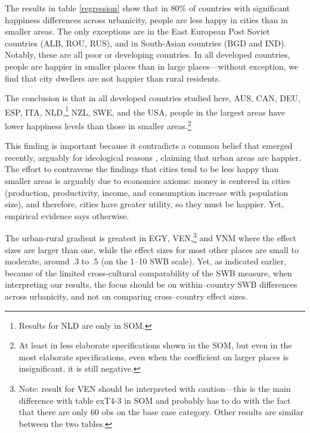 \documentclass[11pt, letterpaper]{article}
\begin{document}

The results in table \ref{regression} %
show that in 80\% of countries with significant happiness differences across
urbanicity, people are less happy in cities than in smaller areas. The only exceptions are in the East European Post Soviet countries (ALB, ROU, RUS), and in South-Asian countries (BGD and IND). Notably, these are all poor or developing countries. In all developed countries, people are happier in smaller places than in large places---without exception, we find that city dwellers are not happier than rural residents. 

%
The conclusion is that in all developed countries studied here, AUS, CAN, DEU, ESP, ITA,
NLD,\footnote{Results  for NLD are only in SOM.} NZL, SWE, and the USA, people in the largest areas have lower happiness levels than those in smaller areas.\footnote{At least in less elaborate specifications shown in the SOM, but even in the most elaborate specifications, even when the coefficient on larger places is insignificant, it is still negative.}

This finding is important because it contradicts a common belief that
emerged recently, arguably for ideological reasons \citep[e.g.,][]{glaeser11,glaeser14,burger20}, claiming that urban areas are happier. The effort to contravene the findings that cities tend to be less happy than smaller areas is arguably due to economics axioms: money is centered in cities (production, productivity, income, and consumption increase with population size), and therefore, cities have greater utility, so they must be happier. Yet, empirical evidence says otherwise.

The urban-rural gradient is greatest in EGY, VEN,\footnote{Note: result for VEN
  should be interpreted with caution---this is the main difference with table
  exT4-3 in SOM and probably has to do with the fact that there are only 60 obs on the base case category. Other results are
  similar between the two tables.} and VNM where the effect sizes are larger than one, while the effect sizes for most other places are small to moderate, around .3 to .5 (on the 1--10 SWB scale).   
Yet, as indicated earlier, because of the limited cross-cultural comparability of the SWB measure, when interpreting our results, the focus should be on within--country SWB differences across urbanicity, and not on comparing cross--country effect sizes.
\end{document}
